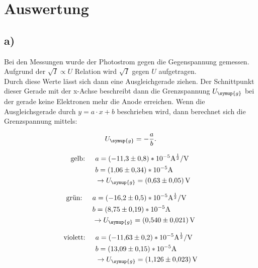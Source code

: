 \newpage
\section{Auswertung}

\subsection{a)}

    \noindent
    Bei den Messungen wurde der Photostrom gegen die Gegenspannung gemessen. 
    Aufgrund der $\sqrt{I} \propto  U$ Relation wird $\sqrt{I} $ gegen $  U$ aufgetragen.\\
    Durch diese Werte lässt sich dann eine Ausgleichgerade ziehen. Der Schnittpunkt dieser Gerade mit der x-Achse beschreibt dann die 
    Grenzspannung $U_{\symup{g}}$ bei der gerade keine Elektronen mehr die Anode erreichen. 
    Wenn die Ausgleichsgerade durch $y = a \cdot x +b$ beschrieben wird, dann berechnet sich die Grenzspannung mittels: 
    \noindent

    \begin{equation}
        U_{\symup{g}} = -  \frac{a}{b}.
    \end{equation}

    \begin{align}
        \text{gelb:  }   \quad     &a = (-\num{11.3}\pm \num{0.8})*10^{-5} \si{\ampere^{\frac{1}{2}}\per\volt} \nonumber\\
                        &b = (\num{1.06}\pm \num{0.34})*10^{-5} \si{\ampere} \nonumber\\
                        & \rightarrow U_{\symup{g}} = \SI{0.63 \pm 0.05}{\volt}
    \end{align}         

    \begin{align}
        \text{grün:  }   \quad     &a = (-\num{16.2}\pm \num{0.5})*10^{-5} \si{\ampere^{\frac{1}{2}}\per\volt} \nonumber\\
                            &b = (\num{8.75}\pm \num{0.19})*10^{-5} \si{\ampere} \nonumber\\
                            & \rightarrow U_{\symup{g}} = \SI{0.54 \pm 0.021}{\volt}
    \end{align}

    \begin{align}
        \text{violett:  }  \quad      &a = (-\num{11.63}\pm \num{0.2})*10^{-5} \si{\ampere^{\frac{1}{2}}\per\volt} \nonumber\\
                               &b = (\num{13.09}\pm \num{0.15})*10^{-5} \si{\ampere} \nonumber\\
                               & \rightarrow U_{\symup{g}} = \SI{1.126 \pm 0.023}{\volt}
    \end{align}

